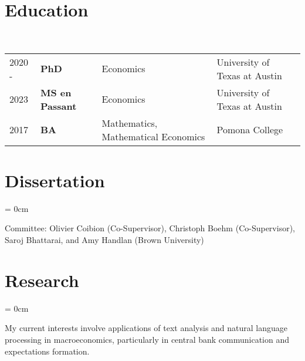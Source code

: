 \documentclass[a4paper, 10pt]{article}
\begin{document}
  \maketitle
  \thispagestyle{firststyle}
  \section{Education}
  ~\begin{tabular}{llll}
    2020 - & \textbf{PhD} & Economics & University of Texas at Austin\\
    2023 & \textbf{MS en Passant} & Economics & University of Texas at Austin\\
    2017 & \textbf{BA} & Mathematics, Mathematical Economics & Pomona College
  \end{tabular}
  \vspace*{0.25em}

  \section{Dissertation}
  \begin{compactitem}\parskip = 0cm
    \item Committee: Olivier Coibion (Co-Supervisor), Christoph Boehm (Co-Supervisor), Saroj Bhattarai, and Amy Handlan (Brown University)
  \end{compactitem}
  \vspace*{0.25em}

  \section{Research}
  \begin{compactitem}\parskip = 0cm
    \item My current interests involve applications of text analysis and natural language processing in macroeconomics, particularly in central bank communication and expectations formation.
  \end{compactitem}
  \vspace*{0.25em}

  \begin{publications}
  \end{publications}
  \vspace*{-0.75em}
  \vspace*{-0.75em}
\end{document}
